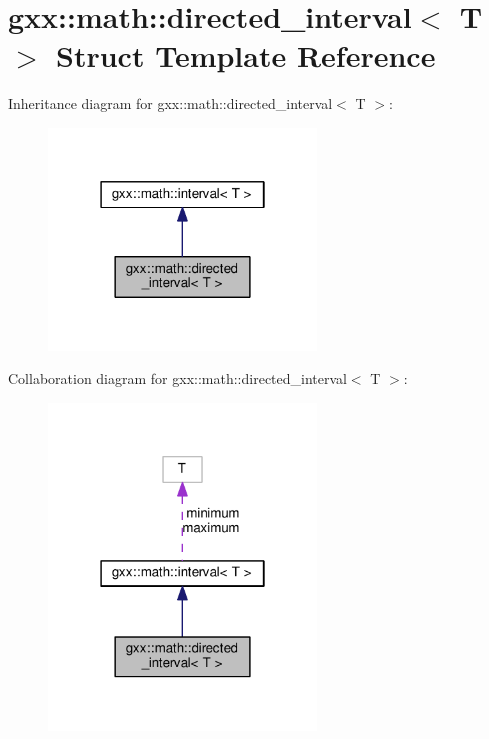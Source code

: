\hypertarget{structgxx_1_1math_1_1directed__interval}{}\section{gxx\+:\+:math\+:\+:directed\+\_\+interval$<$ T $>$ Struct Template Reference}
\label{structgxx_1_1math_1_1directed__interval}


Inheritance diagram for gxx\+:\+:math\+:\+:directed\+\_\+interval$<$ T $>$\+:
\nopagebreak
\begin{figure}[H]
\begin{center}
\leavevmode
\includegraphics[width=202pt]{structgxx_1_1math_1_1directed__interval__inherit__graph}
\end{center}
\end{figure}


Collaboration diagram for gxx\+:\+:math\+:\+:directed\+\_\+interval$<$ T $>$\+:
\nopagebreak
\begin{figure}[H]
\begin{center}
\leavevmode
\includegraphics[width=202pt]{structgxx_1_1math_1_1directed__interval__coll__graph}
\end{center}
\end{figure}
